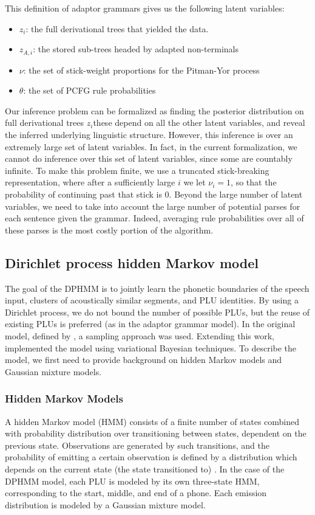 \documentclass[12pt,letterpaper]{article}
\begin{document}
\noindent This definition of adaptor grammars gives us the following latent variables: 
\begin{itemize}
\item $z_i$: the full derivational trees that yielded the data. 
\item $z_{A,i}$: the stored sub-trees headed by adapted non-terminals
\item $\nu$: the set of stick-weight proportions for the Pitman-Yor process
\item $\theta$: the set of PCFG rule probabilities 
\end{itemize}
Our inference problem can be formalized as finding the posterior distribution on full derivational trees $z_i$\textemdash these depend on all the other latent variables, and reveal the inferred underlying linguistic structure. However, this inference is over an extremely large set of latent variables. In fact, in the current formalization, we cannot do inference over this set of latent variables, since some are countably infinite. To make this problem finite, we use a truncated stick-breaking representation, where after a sufficiently large $i$ we let $\nu_i = 1$, so that the probability of continuing past that stick is 0. Beyond the large number of latent variables, we need to take into account the large number of potential parses for each sentence given the grammar. Indeed, averaging rule probabilities over all of these parses is the most costly portion of the algorithm. 

\subsection{Dirichlet process hidden Markov model}
The goal of the DPHMM is to jointly learn the phonetic boundaries of the speech input, clusters of acoustically similar segments, and PLU identities. By using a Dirichlet process, we do not bound the number of possible PLUs, but the reuse of existing PLUs is preferred (as in the adaptor grammar model). In the original model, defined by \citet{lee:2012}, a sampling approach was used. Extending this work, \citet{ondel:2016} implemented the model using variational Bayesian techniques. To describe the model, we first need to provide background on hidden Markov models and Gaussian mixture models.
\subsubsection{Hidden Markov Models}
A hidden Markov model (HMM) consists of a finite number of states combined with probability distribution over transitioning between states, dependent on the previous state. Observations are generated by such transitions, and the probability of emitting a certain observation is defined by a distribution which depends on the current state (the state transitioned to) \citep{rabiner:1986}. In the case of the DPHMM model, each PLU is modeled by its own three-state HMM, corresponding to the start, middle, and end of a phone. Each emission distribution is modeled by a Gaussian mixture model. 
\end{document}
